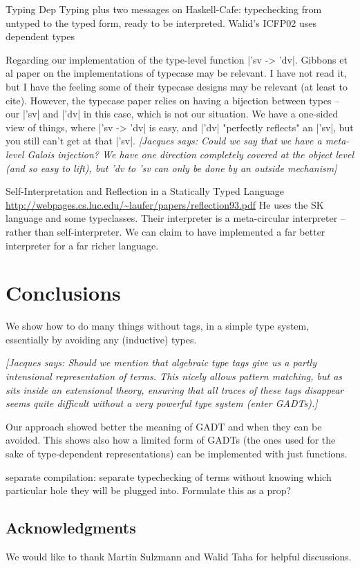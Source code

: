 \documentclass[preprint]{sigplanconf}
\newcommand{\jacques}[1]{{\it [Jacques says: #1]}}
\begin{document}
Typing Dep Typing plus two messages on Haskell-Cafe: typechecking 
from untyped to the typed form, ready to be interpreted. Walid's ICFP02
uses dependent types


Regarding our implementation of the type-level function |'sv -> 'dv|.
Gibbons et al paper on
the implementations of typecase may be relevant. I have not read it,
but I have the feeling some of their typecase designs may be
relevant (at least to cite). 
However, the typecase paper relies on having a 
bijection between types -- our |'sv| and |'dv| in this case, which is not 
our situation.  We have a one-sided view of things, where |'sv -> 'dv| is 
easy, and |'dv| "perfectly reflects" an |'sv|, but you still can't get at 
that |'sv|.  \jacques{Could we say that we have a meta-level Galois
injection?  We have one direction completely covered at the object
level (and so easy to lift), but 'dv to 'sv can only be done by
an outside mechanism}


Self-Interpretation and Reflection in a Statically Typed Language 
\url{http://webpages.cs.luc.edu/~laufer/papers/reflection93.pdf}
He uses the SK language and some typeclasses. Their interpreter is a
meta-circular interpreter -- rather than self-interpreter. We can
claim to have implemented a far better interpreter for a far richer
language.

\section{Conclusions}\label{conclusion}

We show how to do many things without tags, in a simple type system, 
essentially by avoiding any (inductive) types.  

\jacques{Should we mention that algebraic type tags give us a partly
intensional representation of terms.  This nicely allows pattern matching,
but as sits inside an extensional theory, ensuring that all traces 
of these tags disappear seems quite difficult without a very powerful
type system (enter GADTs).}

Our approach showed better the meaning of GADT and when they can be
avoided.
This shows also how a limited form of GADTs (the ones
used for the sake of type-dependent representations) can be
implemented with just functions. 

separate compilation: separate
typechecking of terms without knowing which particular
hole they will be plugged into. Formulate this as a prop?



\subsection*{Acknowledgments}
We would like to thank Martin Sulzmann and Walid Taha 
for helpful discussions.
\end{document}
